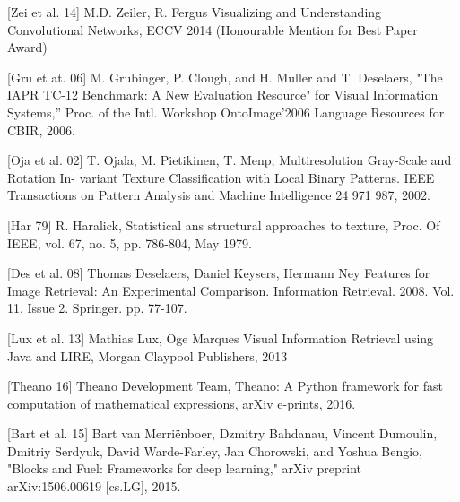 [Zei et al. 14] M.D. Zeiler, R. Fergus Visualizing and Understanding Convolutional Networks, ECCV 2014 (Honourable Mention for Best Paper Award)

[Gru et at. 06] M. Grubinger, P. Clough, and H. Muller and T. Deselaers, "The IAPR TC-12 Benchmark: A New Evaluation Resource" for Visual Information Systems,” Proc. of the Intl. Workshop OntoImage’2006 Language Resources for CBIR, 2006.



[Oja et al. 02] T. Ojala, M. Pietikinen, T. Menp, Multiresolution Gray-Scale and Rotation In-
variant Texture Classification with Local Binary Patterns. IEEE Transactions on
Pattern Analysis and Machine Intelligence 24 971 987, 2002.

[Har 79] R. Haralick, Statistical ans structural approaches to texture, Proc. Of IEEE, vol.
67, no. 5, pp. 786-804, May 1979.

[Des et al. 08] Thomas Deselaers, Daniel Keysers, Hermann Ney Features for Image Retrieval: An Experimental Comparison. Information Retrieval. 2008. Vol. 11. Issue 2. Springer. pp. 77-107.

[Lux et al. 13] Mathias Lux, Oge Marques Visual Information Retrieval using Java and LIRE, Morgan Claypool Publishers, 2013


[Theano 16] Theano Development Team, Theano: A {Python} framework for fast computation of mathematical expressions, arXiv e-prints, 2016.

[Bart et al. 15] Bart van Merriënboer, Dzmitry Bahdanau, Vincent Dumoulin, Dmitriy Serdyuk, David Warde-Farley, Jan Chorowski, and Yoshua Bengio, "Blocks and Fuel: Frameworks for deep learning," arXiv preprint arXiv:1506.00619 [cs.LG], 2015.